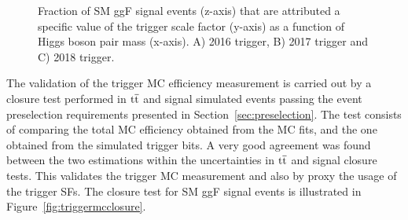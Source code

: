 \clearpage

\begin{figure}[htp!]%
\centering
\captionsetup[subfigure]{justification=centering}
\caption[Fraction of SM ggF signal events that are attribute a specific value of the trigger scale factor as function of the Higgs boson pair mass.]{Fraction of SM ggF signal events (z-axis) that are attributed a specific value of the trigger scale factor (y-axis) as a function of Higgs boson pair mass (x-axis). A) 2016 trigger, B) 2017 trigger and C) 2018 trigger.}
\label{fig:triggersfs}
\end{figure}

The validation of the trigger MC efficiency measurement is carried out by a closure test performed in $\mathrm{t\overline{t}}$ and signal simulated events passing the event preselection requirements presented in Section~\ref{sec:preselection}. The test consists of comparing the total MC efficiency obtained from the MC fits, and the one obtained from the simulated trigger bits. A very good agreement was found between the two estimations within the uncertainties in $\mathrm{t\overline{t}}$ and signal closure tests. This validates the trigger MC measurement and also by proxy the usage of the trigger SFs. The closure test  for SM ggF signal events is illustrated in Figure~\ref{fig:triggermcclosure}.


